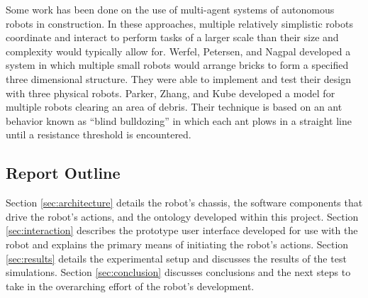 Some work has been done on the use of multi-agent systems of autonomous robots in construction. In these approaches, multiple relatively simplistic robots coordinate and interact to perform tasks of a larger scale than their size and complexity would typically allow for. Werfel, Petersen, and Nagpal \cite{werfel2014designing} developed a system in which multiple small robots would arrange bricks to form a specified three dimensional structure. They were able to implement and test their design with three physical robots. Parker, Zhang, and Kube \cite{parker2003blind} developed a model for multiple robots clearing an area of debris. Their technique is based on an ant behavior known as ``blind bulldozing'' in which each ant plows in a straight line until a resistance threshold is encountered.

\subsection{Report Outline}
Section \ref{sec:architecture} details the robot's chassis, the software components that drive the robot's actions, and the ontology developed within this project. Section \ref{sec:interaction} describes the prototype user interface developed for use with the robot and explains the primary means of initiating the robot's actions. Section \ref{sec:results} details the experimental setup and discusses the results of the test simulations. Section \ref{sec:conclusion} discusses conclusions and the next steps to take in the overarching effort of the robot's development.